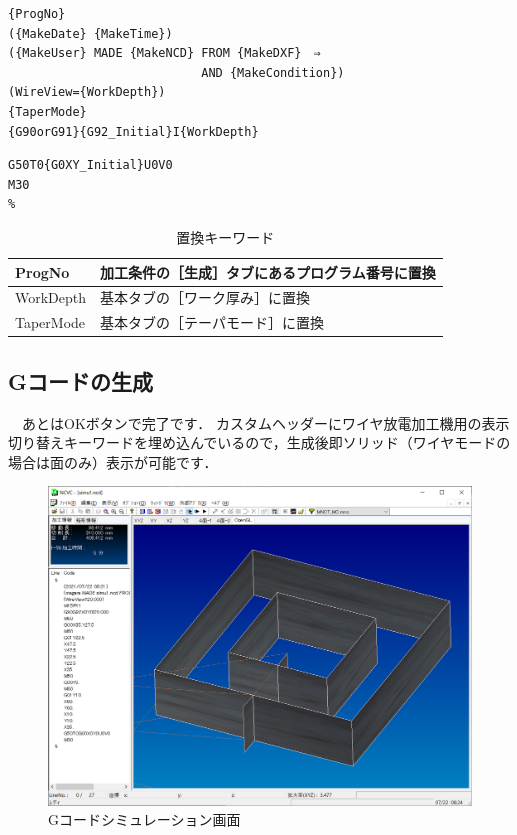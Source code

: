 \begin{minipage}[t]{0.6\textwidth}
\begin{lstlisting}[caption=Header.txt,numbers=none,label=lst:header.txt]
%
{ProgNo}
({MakeDate} {MakeTime})
({MakeUser} MADE {MakeNCD} FROM {MakeDXF}　⇒
                           AND {MakeCondition})
(WireView={WorkDepth})
{TaperMode}
{G90orG91}{G92_Initial}I{WorkDepth}
\end{lstlisting}
\end{minipage}
\begin{minipage}[t]{0.4\textwidth}
\begin{lstlisting}[caption=Footer.txt,numbers=none,label=lst:footer.txt]
G50T0{G0XY_Initial}U0V0
M30
%
\end{lstlisting}
\end{minipage}

\begin{table}[H]
\centering
\caption{置換キーワード}
\label{tab:keyword}
\begin{tabular}{|p{3cm}|p{10cm}|}
\hline
ProgNo & 加工条件の［生成］タブにあるプログラム番号に置換 \\ \hline
WorkDepth & 基本タブの［ワーク厚み］に置換 \\
TaperMode & 基本タブの［テーパモード］に置換 \\ \hline
\end{tabular}
\end{table}

\newpage %
\subsection{Gコードの生成}
　あとはOKボタンで完了です．
カスタムヘッダーにワイヤ放電加工機用の表示切り替えキーワードを埋め込んでいるので，生成後即ソリッド（ワイヤモードの場合は面のみ）表示が可能です．

\begin{figure}[H]
\centering
\includegraphics[scale=0.5]{No1/fig/simu1.png}
\caption{Gコードシミュレーション画面}
\label{fig:simu1.png}
\end{figure}

